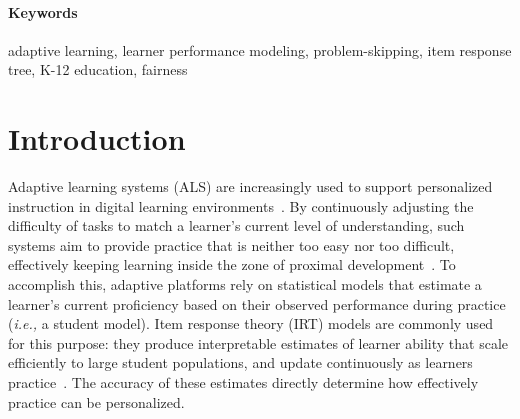 \documentclass[11pt]{article}
\begin{document}
\paragraph{Keywords}
adaptive learning, learner performance modeling, problem-skipping, item response tree, K-12 education, fairness
\newpage 

\section{Introduction}

Adaptive learning systems (ALS) are increasingly used to support personalized instruction in digital learning environments~\parencite{vanlehn2011relative, walkington2013using, jiang2023fly}. By continuously adjusting the difficulty of tasks to match a learner's current level of understanding, such systems aim to provide practice that is neither too easy nor too difficult, effectively keeping learning inside the zone of proximal development~\parencite{vygotsky1978mind}. To accomplish this, adaptive platforms rely on statistical models that estimate a learner's current proficiency based on their observed performance during practice (\textit{i.e.,} a student model). Item response theory (IRT) models are commonly used for this purpose: they produce interpretable estimates of learner ability that scale efficiently to large student populations, and update continuously as learners practice~\parencite{rasch1993probabilistic, klinkenberg2011computer, weiss1982improving, jiang2023fly}. The accuracy of these estimates directly determine how effectively practice can be personalized.
\end{document}
